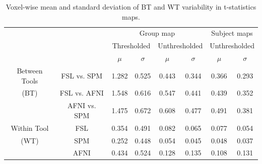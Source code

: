 \documentclass[11pt,onecolumn]{article}
\begin{document}
\setlength{\tabcolsep}{5pt}
\begin{table}[h]
    \centering
    \begin{tabular}{cccccc|cc}
        \toprule
        && \multicolumn{4}{c|}{Group map} & \multicolumn{2}{c}{Subject maps}\\
        \multirow{2}{*}{}& {} & \multicolumn{2}{c}{Thresholded} & \multicolumn{2}{c|}{Unthresholded} & \multicolumn{2}{c}{Unthresholded} \\
        {} & {} & $\mu$ & $\sigma$ & $\mu$ & $\sigma$ & $\mu$ & $\sigma$ \\
        \midrule
        \rowcolor{lightgray!50}
        {Between Tools} & FSL vs. SPM        &  1.282       & 0.525      & 0.443     & 0.344  & 0.366       & 0.293     \\
        \rowcolor{lightgray!50}
        {(BT)} & FSL vs. AFNI                &  1.548       & 0.616      & 0.547     & 0.441  & 0.439       & 0.352     \\
        \rowcolor{lightgray!50} 
        {} & AFNI vs. SPM                    &  1.475       & 0.672      & 0.608     & 0.477  & 0.491       & 0.381     \\
        {Within Tool} & FSL                  &  0.354       & 0.491      & 0.082     & 0.065  & 0.077       & 0.054     \\
        {(WT)}   & SPM                       &  0.252       & 0.448      & 0.054     & 0.045  & 0.048       & 0.037     \\
        {}   & AFNI                          &  0.434       & 0.524      & 0.128     & 0.135  & 0.108       & 0.131     \\
        \bottomrule
    \end{tabular}
    \caption{Voxel-wise mean and standard deviation of BT and WT variability
    in t-statistics maps. }
    \label{table:pipeline-stats}
\end{table}
\end{document}
